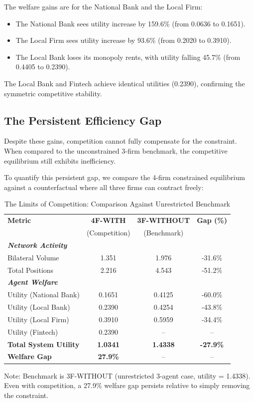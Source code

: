The welfare gains are for the National Bank and the Local Firm:
\begin{itemize}
    \item The National Bank sees utility increase by 159.6\% (from 0.0636 to 0.1651).
    \item The Local Firm sees utility increase by 93.6\% (from 0.2020 to 0.3910).
    \item The Local Bank loses its monopoly rents, with utility falling 45.7\% (from 0.4405 to 0.2390).
\end{itemize}

The Local Bank and Fintech achieve identical utilities (0.2390), confirming the symmetric competitive stability.

\subsection{The Persistent Efficiency Gap}

Despite these gains, competition cannot fully compensate for the constraint. When compared to the unconstrained 3-firm benchmark, the competitive equilibrium still exhibits inefficiency.

To quantify this persistent gap, we compare the 4-firm constrained equilibrium against a counterfactual where all three firms can contract freely:

\begin{table}[h]
\centering
\caption{The Limits of Competition: Comparison Against Unrestricted Benchmark}
\label{tab:4firm_comparison}
\begin{tabular}{lccc}
\hline
\textbf{Metric} & \textbf{4F-WITH} & \textbf{3F-WITHOUT} & \textbf{Gap (\%)} \\ 
 & (Competition) & (Benchmark) & \\ \hline
\textit{\textbf{Network Activity}} & & & \\
Bilateral Volume & 1.351 & 1.976 & -31.6\% \\
Total Positions & 2.216 & 4.543 & -51.2\% \\
\hline
\textit{\textbf{Agent Welfare}} & & & \\
Utility (National Bank) & 0.1651 & 0.4125 & -60.0\% \\
Utility (Local Bank) & 0.2390 & 0.4254 & -43.8\% \\
Utility (Local Firm) & 0.3910 & 0.5959 & -34.4\% \\
Utility (Fintech) & 0.2390 & -- & -- \\ \hline
\textbf{Total System Utility} & \textbf{1.0341} & \textbf{1.4338} & \textbf{-27.9\%} \\
\textbf{Welfare Gap} & \textbf{27.9\%} & -- & -- \\
\hline
\end{tabular}
\begin{tablenotes}
\small
\item Note: Benchmark is 3F-WITHOUT (unrestricted 3-agent case, utility = 1.4338). Even with competition, a 27.9\% welfare gap persists relative to simply removing the constraint.
\end{tablenotes}
\end{table}

